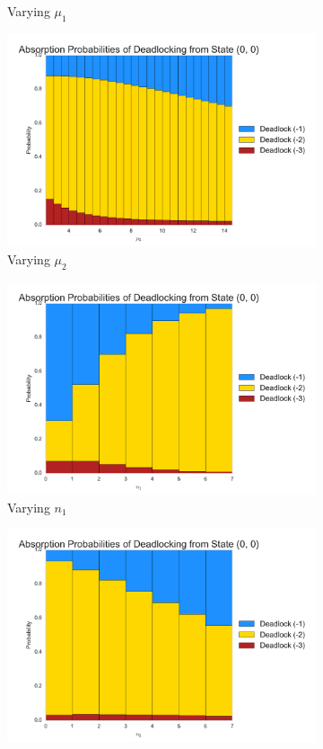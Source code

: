 \documentclass{article}
\begin{document}
\begin{figure}[H]
\begin{subfigure}[b]{0.5\textwidth}
  \caption{Varying $\mu_1$}
  \label{fig:absprobmu1}
\end{subfigure}
\begin{subfigure}[b]{0.5\textwidth}
  \includegraphics[width=\textwidth]{images/absprobmu2}
  \caption{Varying $\mu_2$}
  \label{fig:absprobmu2}
\end{subfigure}
\begin{subfigure}[b]{0.5\textwidth}
  \includegraphics[width=\textwidth]{images/absprobn1}
  \caption{Varying $n_1$}
  \label{fig:absprobn1}
\end{subfigure}
\begin{subfigure}[b]{0.5\textwidth}
  \includegraphics[width=\textwidth]{images/absprobn2}

\end{subfigure}
\end{figure}
\end{document}
